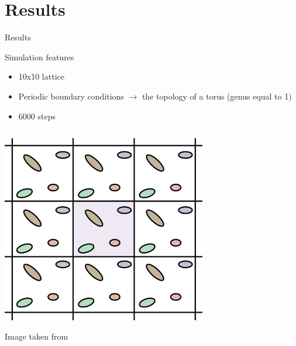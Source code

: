 \documentclass{beamer}
\begin{document}
\section{Results}

\begin{frame}
\begin{center}
{\Huge Results}
\end{center}
\end{frame}

\begin{frame}{Simulation features}
\begin{itemize}
\item 10x10 lattice 
\item Periodic boundary conditions $\rightarrow$ the topology of a torus (genus equal to 1) 
\item 6000 steps 
\end{itemize}
\begin{columns}
\begin{column}{0.5\textwidth}
    \begin{center}
     \includegraphics[width=0.7\textwidth]{Pic/PBC.png}
      \end{center}
      \begin{center}
          Image taken from \cite{PBC}
     \end{center}
\end{column}
\begin{column}{0.5\textwidth}


\end{column}
\end{columns}
\end{frame}
\end{document}
